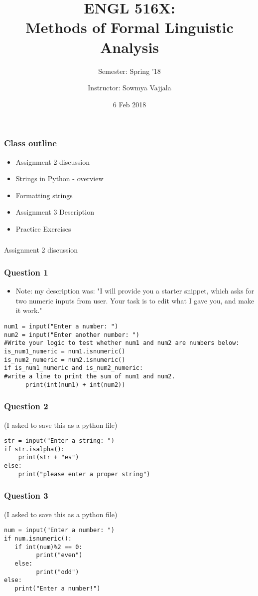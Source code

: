 \documentclass{beamer}
\author[Sowmya Vajjala]{Instructor: Sowmya Vajjala}
\title[ENGL 516X]{ENGL 516X: \\ Methods of Formal Linguistic Analysis}
\subtitle{Semester: Spring '18}
\date{6 Feb 2018}
\institute{Iowa State University, USA}
\begin{document}
\begin{frame}\titlepage
\end{frame}

\begin{frame}%
\frametitle{Class outline}
\begin{itemize}
\item Assignment 2 discussion
\item Strings in Python - overview
\item Formatting strings
\item Assignment 3 Description
\item Practice Exercises
\end{itemize}
\end{frame} %

\begin{frame}
\frametitle{}
\Large Assignment 2 discussion
\end{frame}

\begin{frame}[fragile]
\frametitle{Question 1}
\begin{itemize}
\item Note: my description was: "I will provide you a starter snippet, which asks for two numeric inputs from
user. Your task is to edit what I gave you, and make it work."
\end{itemize} \scriptsize
\begin{verbatim}
num1 = input("Enter a number: ")
num2 = input("Enter another number: ")
#Write your logic to test whether num1 and num2 are numbers below:
is_num1_numeric = num1.isnumeric()
is_num2_numeric = num2.isnumeric()
if is_num1_numeric and is_num2_numeric:
#write a line to print the sum of num1 and num2. 
      print(int(num1) + int(num2))
\end{verbatim}
\end{frame}

\begin{frame}[fragile]
\frametitle{Question 2}
(I asked to save this as a python file)
\begin{verbatim}
str = input("Enter a string: ")
if str.isalpha():
    print(str + "es")
else:
    print("please enter a proper string")
\end{verbatim}
\end{frame}

\begin{frame}[fragile]
\frametitle{Question 3}
(I asked to save this as a python file)
\begin{verbatim}
num = input("Enter a number: ")
if num.isnumeric():
   if int(num)%2 == 0:
         print("even")
   else:
         print("odd")
else:
   print("Enter a number!")
\end{verbatim}
\end{frame}
\end{document}
